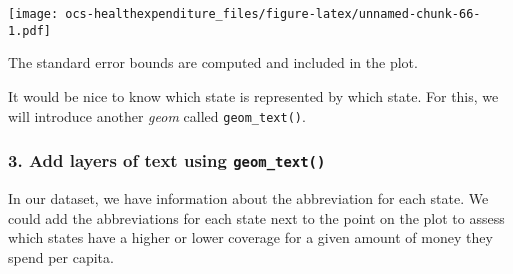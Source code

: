 \documentclass[]{article}
\newenvironment{Shaded}{\begin{snugshade}}{\end{snugshade}}
\newcommand{\DataTypeTok}[1]{\textcolor[rgb]{0.13,0.29,0.53}{#1}}
\newcommand{\KeywordTok}[1]{\textcolor[rgb]{0.13,0.29,0.53}{\textbf{#1}}}
\newcommand{\NormalTok}[1]{#1}
\newcommand{\OperatorTok}[1]{\textcolor[rgb]{0.81,0.36,0.00}{\textbf{#1}}}
\newcommand{\StringTok}[1]{\textcolor[rgb]{0.31,0.60,0.02}{#1}}
\begin{document}
\begin{Shaded}
\end{Shaded}

\texttt{[image: ocs-healthexpenditure\_files/figure-latex/unnamed-chunk-66-1.pdf]}

The standard error bounds are computed and included in the plot.

It would be nice to know which state is represented by which state. For
this, we will introduce another \emph{geom} called
\texttt{geom\_text()}.

\hypertarget{add-layers-of-text-using-geom_text}{%
\subsubsection{\texorpdfstring{3. Add layers of text using
\texttt{geom\_text()}}{3. Add layers of text using geom\_text()}}\label{add-layers-of-text-using-geom_text}}

In our dataset, we have information about the abbreviation for each
state. We could add the abbreviations for each state next to the point
on the plot to assess which states have a higher or lower coverage for a
given amount of money they spend per capita.
\end{document}
